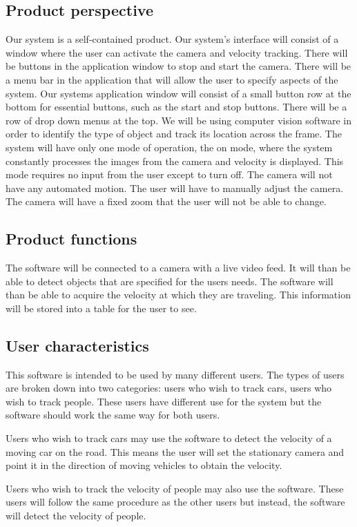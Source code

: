 \documentclass[letterpaper,10pt,onecolumn,draftclsnofoot]{IEEEtran}
\begin{document}
\subsection{Product perspective}
Our system is a self-contained product. 
Our system's interface will consist of a window where the user can activate the camera and velocity tracking.
There will be buttons in the application window to stop and start the camera. 
There will be a menu bar in the application that will allow the user to specify aspects of the system.
Our systems application window will consist of a small button row at the bottom for essential buttons, such as the start and stop buttons.
There will be a row of drop down menus at the top.
We will be using computer vision software in order to identify the type of object and track its location across the frame.
The system will have only one mode of operation, the on mode, where the system constantly processes the images from the camera and velocity is displayed.
This mode requires no input from the user except to turn off.
The camera will not have any automated motion.
The user will have to manually adjust the camera.
The camera will have a fixed zoom that the user will not be able to change.

\subsection{Product functions}
The software will be connected to a camera with a live video feed.
It will than be able to detect objects that are specified for the users needs.
The software will than be able to acquire the velocity at which they are traveling.
This information will be stored into a table for the user to see.


\subsection{User characteristics}
This software is intended to be used by many different users.
The types of users are broken down into two categories: users who wish to track cars, users who wish to track people.
These users have different use for the system but the software should work the same way for both users.

Users who wish to track cars may use the software to detect the velocity of a moving car on the road.
This means the user will set the stationary camera and point it in the direction of moving vehicles to obtain the velocity.

Users who wish to track the velocity of people may also use the software.
These users will follow the same procedure as the other users but instead, the software will detect the velocity of people.
\end{document}
